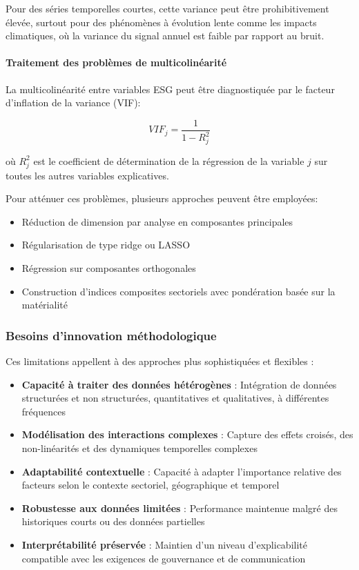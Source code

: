 Pour des séries temporelles courtes, cette variance peut être prohibitivement élevée, surtout pour des phénomènes à évolution lente comme les impacts climatiques, où la variance du signal annuel est faible par rapport au bruit.

\paragraph{Traitement des problèmes de multicolinéarité}
La multicolinéarité entre variables ESG peut être diagnostiquée par le facteur d'inflation de la variance (VIF):

\begin{equation}
VIF_j = \frac{1}{1-R_j^2}
\end{equation}

où $R_j^2$ est le coefficient de détermination de la régression de la variable $j$ sur toutes les autres variables explicatives.

Pour atténuer ces problèmes, plusieurs approches peuvent être employées:
\begin{itemize}
    \item Réduction de dimension par analyse en composantes principales
    \item Régularisation de type ridge ou LASSO
    \item Régression sur composantes orthogonales
    \item Construction d'indices composites sectoriels avec pondération basée sur la matérialité
\end{itemize}

\subsubsection{Besoins d'innovation méthodologique}

Ces limitations appellent à des approches plus sophistiquées et flexibles :

\begin{itemize}
    \item \textbf{Capacité à traiter des données hétérogènes} : Intégration de données structurées et non structurées, quantitatives et qualitatives, à différentes fréquences
    
    \item \textbf{Modélisation des interactions complexes} : Capture des effets croisés, des non-linéarités et des dynamiques temporelles complexes
    
    \item \textbf{Adaptabilité contextuelle} : Capacité à adapter l'importance relative des facteurs selon le contexte sectoriel, géographique et temporel
    
    \item \textbf{Robustesse aux données limitées} : Performance maintenue malgré des historiques courts ou des données partielles
    
    \item \textbf{Interprétabilité préservée} : Maintien d'un niveau d'explicabilité compatible avec les exigences de gouvernance et de communication
\end{itemize}

